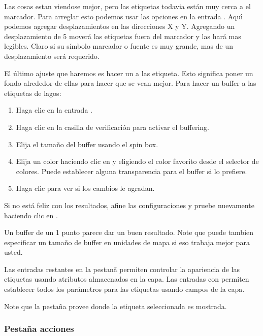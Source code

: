 Las cosas estan viendose mejor, pero las etiquetas todavia est\'an muy cerca a el marcador. Para
arreglar esto podemos usar las opciones en la entrada . Aqu\'{\i} podemos agregar 
desplazamientos en las direcciones X y Y. Agregando un desplazamiento de 5 mover\'a las etiquetas
fuera del marcador y las har\'a mas legibles. Claro si su s\'{i}mbolo marcador
o fuente es muy grande, mas de un desplazamiento ser\'a requerido.

El \'ultimo ajuste que haremos es hacer un  a las etiqueta. Esto significa
poner un fondo alrededor de ellas para hacer que se vean mejor. Para hacer un buffer a las
etiquetas de lagos:

\begin{enumerate}
\item Haga clic en la entrada .
\item Haga clic en la casilla de verificaci\'on   para activar el buffering.
\item Elija el tama\~no del buffer usando el spin box.
\item Elija un color haciendo clic en  y eligiendo el color favorito
  desde el selector de colores. Puede establecer alguna transparencia para el buffer
  si lo prefiere.
\item Haga clic  para ver si los cambios le agradan.
\end{enumerate} 

Si no est\'a feliz con los resultados, afine las configuraciones y pruebe nuevamente
haciendo clic en .

Un buffer de un 1 punto parece dar un buen resultado.
Note que puede tambien especificar un tama\~no de buffer en unidades de mapa si eso trabaja mejor
para usted.

Las entradas restantes en la pestan\~a  permiten controlar la apariencia de las
etiquetas usando atributos almacenados en la capa. Las entradas con  permiten establecer
todos los par\'ametros para las etiquetas usando campos de la capa.

Note que la pesta\~na  provee  donde 
la etiqueta seleccionada es mostrada.

\subsubsection{Pesta\~na acciones}\label{label_actions}


